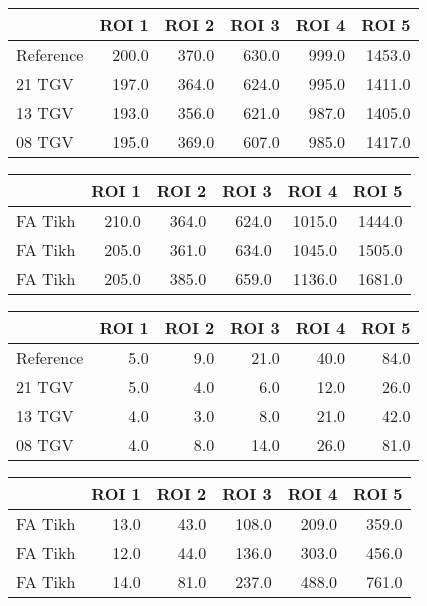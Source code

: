 \begin{tabular}{lrrrrr}
\toprule
{} &  ROI 1 &  ROI 2 &  ROI 3 &  ROI 4 &   ROI 5 \\
\midrule
Reference &  200.0 &  370.0 &  630.0 &  999.0 &  1453.0 \\
21 TGV    &  197.0 &  364.0 &  624.0 &  995.0 &  1411.0 \\
13 TGV    &  193.0 &  356.0 &  621.0 &  987.0 &  1405.0 \\
08 TGV    &  195.0 &  369.0 &  607.0 &  985.0 &  1417.0 \\
\bottomrule
\end{tabular}
\begin{tabular}{lrrrrr}
\toprule
{} &  ROI 1 &  ROI 2 &  ROI 3 &   ROI 4 &   ROI 5 \\
\midrule
FA Tikh &  210.0 &  364.0 &  624.0 &  1015.0 &  1444.0 \\
FA Tikh &  205.0 &  361.0 &  634.0 &  1045.0 &  1505.0 \\
FA Tikh &  205.0 &  385.0 &  659.0 &  1136.0 &  1681.0 \\
\bottomrule
\end{tabular}
\begin{tabular}{lrrrrr}
\toprule
{} &  ROI 1 &  ROI 2 &  ROI 3 &  ROI 4 &  ROI 5 \\
\midrule
Reference &    5.0 &    9.0 &   21.0 &   40.0 &   84.0 \\
21 TGV    &    5.0 &    4.0 &    6.0 &   12.0 &   26.0 \\
13 TGV    &    4.0 &    3.0 &    8.0 &   21.0 &   42.0 \\
08 TGV    &    4.0 &    8.0 &   14.0 &   26.0 &   81.0 \\
\bottomrule
\end{tabular}
\begin{tabular}{lrrrrr}
\toprule
{} &  ROI 1 &  ROI 2 &  ROI 3 &  ROI 4 &  ROI 5 \\
\midrule
FA Tikh &   13.0 &   43.0 &  108.0 &  209.0 &  359.0 \\
FA Tikh &   12.0 &   44.0 &  136.0 &  303.0 &  456.0 \\
FA Tikh &   14.0 &   81.0 &  237.0 &  488.0 &  761.0 \\
\bottomrule
\end{tabular}
